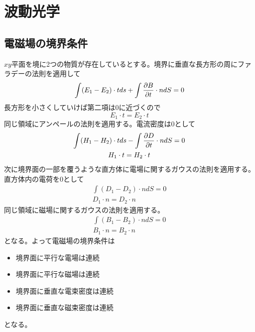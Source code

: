 \section{波動光学}

\subsection{電磁場の境界条件}
    $xy$平面を境に2つの物質が存在しているとする。境界に垂直な長方形の周にファラデーの法則を適用して
        \[\int (E_1 - E_2) \cdot t ds + \int \pd[B]{t} \cdot n dS = 0\]
    長方形を小さくしていけば第二項は0に近づくので
        \[E_1 \cdot t = E_2 \cdot t\]
    同じ領域にアンペールの法則を適用する。電流密度は0として
    \begin{gather*}
        \int (H_1 - H_2) \cdot t ds - \int \pd[D]{t} \cdot n dS = 0\\
        H_1 \cdot t = H_2 \cdot t
    \end{gather*}
    次に境界面の一部を覆うような直方体に電場に関するガウスの法則を適用する。直方体内の電荷を0として
    \begin{gather*}
        \int (D_1 - D_2) \cdot n dS = 0\\
        D_1 \cdot n = D_2 \cdot n
    \end{gather*}
    同じ領域に磁場に関するガウスの法則を適用する。
    \begin{gather*}
        \int (B_1 - B_2) \cdot n dS = 0\\
        B_1 \cdot n = B_2 \cdot n
    \end{gather*}
    となる。よって電磁場の境界条件は
    \begin{itemize}
        \item 境界面に平行な電場は連続
        \item 境界面に平行な磁場は連続
        \item 境界面に垂直な電束密度は連続
        \item 境界面に垂直な磁束密度は連続
    \end{itemize}
    となる。

